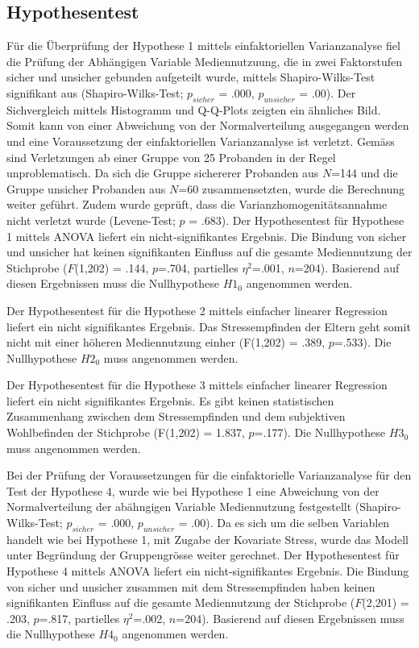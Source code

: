 \subsection{Hypothesentest} \label{sec:Hypothesentest}
Für die Überprüfung der Hypothese 1 mittels einfaktoriellen Varianzanalyse fiel die Prüfung der Abhängigen Variable Mediennutzuung, die in zwei Faktorstufen sicher und unsicher gebunden aufgeteilt wurde, mittels Shapiro-Wilks-Test \cite{Shapiro1965} signifikant aus (Shapiro-Wilks-Test; $p_{sicher}$ = .000, $p_{unsicher}$ = .00). Der Sichvergleich mittels Histogramm und Q-Q-Plots zeigten ein ähnliches Bild. Somit kann von einer Abweichung von der Normalverteilung ausgegangen werden \cite{Hemmerich2018} und eine Voraussetzung der einfaktoriellen Varianzanalyse ist verletzt. Gemäss  sind Verletzungen ab einer Gruppe von 25 Probanden in der Regel unproblematisch. Da sich die Gruppe sichererer Probanden aus $N$=144 und die Gruppe unsicher Probanden aus $N$=60 zusammensetzten, wurde die Berechnung weiter geführt. Zudem wurde geprüft, dass die Varianzhomogenitätsannahme nicht verletzt wurde (Levene-Test; $p$ = .683). Der Hypothesentest für Hypothese 1 mittels ANOVA liefert ein nicht-signifikantes Er\-gebnis. Die Bindung von sicher und unsicher hat keinen signifikanten Einfluss auf die ge\-samte Medien\-nutzung der Stichprobe ($F$(1,202) = .144, $p$=.704, partielles $\eta^2$=.001, $n$=204). Basierend auf diesen Ergebnissen muss die Nullhypothese $H1_{0}$ angenommen werden. 


Der Hypothesentest für die Hypothese 2 mittels einfacher linearer Regression liefert ein nicht signifikantes Ergebnis. Das Stressempfinden der Eltern geht somit nicht mit einer höheren Mediennutzung einher (F(1,202) = .389, $p$=.533). Die Nullhypothese $H2_{0}$ muss angenommen werden.

Der Hypothesentest für die Hypothese 3 mittels einfacher linearer Regression liefert ein nicht signifikantes Ergebnis. Es gibt keinen statistischen Zusammenhang zwischen dem Stressempfinden und dem subjektiven Wohlbefinden der Stichprobe (F(1,202) = 1.837, $p$=.177).  Die Nullhypothese $H3_{0}$ muss angenommen werden.

Bei der Prüfung der Voraussetzungen für die einfaktorielle Varianzanalyse für den Test der Hypothese 4, wurde wie bei Hypothese 1 eine Abweichung von der Normalverteilung der abähngigen Variable Mediennutzung festgestellt (Shapiro-Wilks-Test; $p_{sicher}$ = .000, $p_{unsicher}$ = .00). Da es sich um die selben Variablen handelt wie bei Hypothese 1, mit Zugabe der Kovariate Stress, wurde das Modell unter Begründung der Gruppengrösse weiter gerechnet. Der Hypothesentest für Hypothese 4 mittels ANOVA liefert ein nicht-signifikantes Er\-gebnis. Die Bindung von sicher und unsicher zusammen mit dem Stressempfinden haben keinen signifikanten Einfluss auf die ge\-samte Medien\-nutzung der Stichprobe ($F$(2,201) = .203, $p$=.817, partielles $\eta^2$=.002, $n$=204). Basierend auf diesen Ergebnissen muss die Nullhypothese $H4_{0}$ angenommen werden. 

